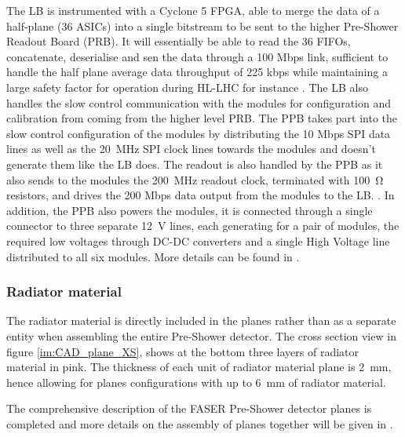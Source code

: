 					The LB is instrumented with a Cyclone 5 FPGA, able to merge the data of a half-plane (36 ASICs) into a single bitstream to be sent to the higher Pre-Shower Readout Board (PRB). It will essentially be able to read the 36 FIFOs, concatenate, deserialise and sen the data through a 100 Mbps link, sufficient to handle the half plane average data throughput of 225 kbps while maintaining a large safety factor for operation during HL-LHC for instance \cite{PreShower_TP}. The LB also handles the slow control communication with the modules for configuration and calibration from coming from the higher level PRB. 
					The PPB takes part into the slow control configuration of the modules by distributing the 10 Mbps SPI data lines as well as the \SI{20}{\mega\hertz} SPI clock lines towards the modules and doesn't generate them like the LB does. The readout is also handled by the PPB as it also sends to the modules the \SI{200}{\mega\hertz} readout clock, terminated with \SI{100}{\ohm} resistors, and drives the 200 Mbps data output from the modules to the LB. . In addition, the PPB also powers the modules, it is connected through a single connector to three separate \SI{12}{\volt} lines, each generating for a pair of modules, the required low voltages through DC-DC converters and a single High Voltage line distributed to all six modules. More details can be found in .   
				
				\subsubsection{Radiator material}
				The radiator material is directly included in the planes rather than as a separate entity when assembling the entire Pre-Shower detector. The cross section view in figure \ref{im:CAD_plane_XS}, shows at the bottom three layers of radiator material in pink. The thickness of each unit of radiator material plane is \SI{2}{\milli\meter}, hence allowing for planes configurations with up to \SI{6}{\milli\meter} of radiator material.   
		
		The comprehensive description of the FASER Pre-Shower detector planes is completed and more details on the assembly of planes together will be given in .
		\clearpage
		
				
				
		
		
		
		
		
		
